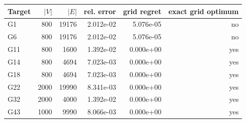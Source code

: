 \begin{tabular}{lrrrrr}
\toprule
Target & $|V|$ & $|E|$ & rel. error & grid regret & exact grid optimum\\
\midrule
G1 & 800 & 19176 & 2.012e-02 & 5.076e-05 & no\\
G6 & 800 & 19176 & 2.012e-02 & 5.076e-05 & no\\
G11 & 800 & 1600 & 1.392e-02 & 0.000e+00 & yes\\
G14 & 800 & 4694 & 7.023e-03 & 0.000e+00 & yes\\
G18 & 800 & 4694 & 7.023e-03 & 0.000e+00 & yes\\
G22 & 2000 & 19990 & 8.341e-03 & 0.000e+00 & yes\\
G32 & 2000 & 4000 & 1.392e-02 & 0.000e+00 & yes\\
G43 & 1000 & 9990 & 8.066e-03 & 0.000e+00 & yes\\
\bottomrule
\end{tabular}
